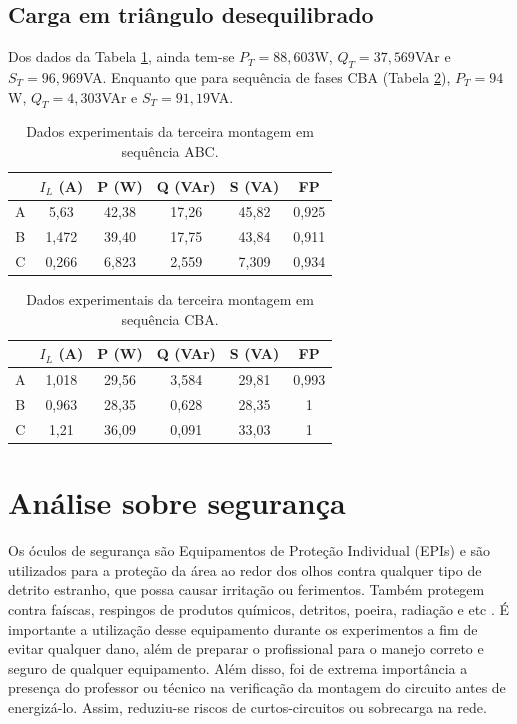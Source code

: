 \documentclass[a4paper,12pt,oneside,openany,table,xcdraw]{article}
\begin{document}
\subsection{Carga em triângulo desequilibrado} \label{m3:dados}
Dos dados da Tabela \ref{m3:dados:abc}, ainda tem-se $P_T = 88,603$W, $Q_T = 37,569$VAr e $S_T = 96,969$VA. Enquanto que para sequência de fases CBA (Tabela \ref{m3:dados:cba}), $P_T = 94$W, $Q_T = 4,303$VAr e $S_T = 91,19$VA.

\begin{table}[H]
\centering \small {}
\caption{Dados experimentais da terceira montagem em sequência ABC.}
\label{m3:dados:abc}
\begin{tabular}{c|c|c|c|c|c|}
\cline{2-6}
                        & $I_L$ (A) & P (W) & Q (VAr) & S (VA) & FP    \\ \hline
\multicolumn{1}{|c|}{A} & 5,63      & 42,38 & 17,26   & 45,82  & 0,925 \\ \hline
\multicolumn{1}{|c|}{B} & 1,472     & 39,40 & 17,75   & 43,84  & 0,911 \\ \hline
\multicolumn{1}{|c|}{C} & 0,266     & 6,823 & 2,559   & 7,309  & 0,934 \\ \hline
\end{tabular}
\end{table}

\begin{table}[H]
\centering \small {}
\caption{Dados experimentais da terceira montagem em sequência CBA.}
\label{m3:dados:cba}
\begin{tabular}{c|c|c|c|c|c|}
\cline{2-6}
 & $I_L$ (A) & P (W) & Q (VAr) & S (VA) & FP \\ \hline
\multicolumn{1}{|c|}{A} & 1,018 & 29,56 & 3,584 & 29,81 & 0,993 \\ \hline
\multicolumn{1}{|c|}{B} & 0,963 & 28,35 & 0,628 & 28,35 & 1 \\ \hline
\multicolumn{1}{|c|}{C} & 1,21 & 36,09 & 0,091 & 33,03 & 1 \\ \hline
\end{tabular}
\end{table}


\section{Análise sobre segurança} %
Os óculos de segurança são Equipamentos de Proteção Individual (EPIs) e são utilizados para a proteção da área ao redor dos olhos contra qualquer tipo de detrito estranho, que possa causar irritação ou ferimentos. Também protegem contra faíscas, respingos de produtos químicos, detritos, poeira, radiação e etc \cite{safe}.
É importante a utilização desse equipamento durante os experimentos a fim de evitar qualquer dano, além de preparar o profissional para o manejo correto e seguro de qualquer equipamento.
Além disso, foi de extrema importância a presença do professor ou técnico na verificação da montagem do circuito antes de energizá-lo. Assim, reduziu-se riscos de curtos-circuitos ou sobrecarga na rede.
\end{document}
